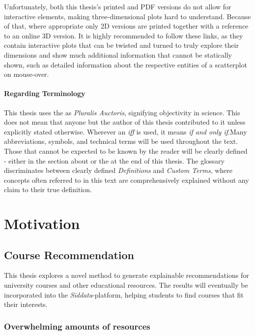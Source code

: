 Unfortunately, both this thesis's printed and PDF versions do not allow for interactive elements, making three-dimensional plots hard to understand. Because of that, where appropriate only 2D versions are printed together with a reference to an online 3D version. It is highly recommended to follow these links, as they contain interactive plots that can be twisted and turned to truly explore their dimensions and show much additional information that cannot be statically shown, such as detailed information about the respective entities of a scatterplot on mouse-over.

\paragraph*{Regarding Terminology}

This thesis uses the  as \emph{Pluralis Auctoris}, signifying objectivity in science. This does not mean that anyone but the author of this thesis contributed to it unless explicitly stated otherwise. Wherever an \textit{iff} is used, it means \textit{if and only if}.Many abbreviations, symbols, and technical terms will be used throughout the text. Those that cannot be expected to be known by the reader will be clearly defined - either in the section about  or the  at the end of this thesis. The glossary discriminates between clearly defined \textit{Definitions} and \textit{Custom Terms}, where concepts often referred to in this text are comprehensively explained without any claim to their true definition. 

\section{Motivation}

\subsection{Course Recommendation}

This thesis explores a novel method to generate explainable recommendations for university courses and other educational resources. The results will eventually be incorporated into the \emph{Siddata}-platform, helping students to find courses that fit their interests.

\subsubsection*{Overwhelming amounts of resources}
\label{sec:many_resources}

